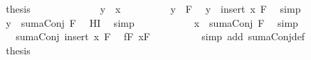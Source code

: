 \begin{isabellebody}
\ \ \ \ \ \ \isamarkupfalse%
\ \isamarkupfalse%
\ {\isacharquery}thesis\ \isacommand{{\isachardot}}\isamarkupfalse%
\isanewline
\ \ \ \ \isamarkupfalse%
\isanewline
\ \ \ \ \ \ \isamarkupfalse%
\ {\isachardoublequoteopen}y\ {\isasymnoteq}\ x{\isachardoublequoteclose}\isanewline
\ \ \ \ \ \ \isamarkupfalse%
\ \isamarkupfalse%
\ {\isachardoublequoteopen}y\ {\isasymin}\ F{\isachardoublequoteclose}\ \isamarkupfalse%
\ {\isacharbackquoteopen}y\ {\isasymin}\ insert\ x\ F{\isacharbackquoteclose}\ \isamarkupfalse%
\ simp\isanewline
\ \ \ \ \ \ \isamarkupfalse%
\ \isamarkupfalse%
\ {\isachardoublequoteopen}y\ {\isasymle}\ sumaConj\ F{\isachardoublequoteclose}\ \isamarkupfalse%
\ HI\ \isamarkupfalse%
\ simp\isanewline
\ \ \ \ \ \ \isamarkupfalse%
\ \isamarkupfalse%
\ {\isachardoublequoteopen}{\isasymdots}\ {\isasymle}\ x\ {\isacharplus}\ {\isacharparenleft}sumaConj\ F{\isacharparenright}{\isachardoublequoteclose}\ \isamarkupfalse%
\ simp\isanewline
\ \ \ \ \ \ \isamarkupfalse%
\ \isamarkupfalse%
\ {\isachardoublequoteopen}{\isasymdots}\ {\isacharequal}\ sumaConj\ {\isacharparenleft}insert\ x\ F{\isacharparenright}{\isachardoublequoteclose}\ \isamarkupfalse%
\ fF\ xF\isanewline
\ \ \ \ \ \ \ \ \isamarkupfalse%
\ {\isacharparenleft}simp\ add{\isacharcolon}\ sumaConj{\isacharunderscore}def{\isacharparenright}\isanewline
\ \ \ \ \ \ \isamarkupfalse%
\ \isamarkupfalse%
\ {\isacharquery}thesis\ \isacommand{{\isachardot}}\isamarkupfalse%
\isanewline
\ \ \ \ \isamarkupfalse%
\isanewline
\ \ \isamarkupfalse%
\isanewline
{}\isamarkupfalse%
%
\endisatagproof
{\isafoldproof}%
%
\isadelimproof
%
\endisadelimproof
%
\isadelimtheory
%
\endisadelimtheory
%
\isatagtheory
%
\endisatagtheory
{\isafoldtheory}%
%
\isadelimtheory
%
\endisadelimtheory
%
\end{isabellebody}%
\endinput
